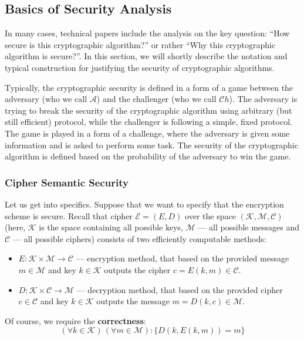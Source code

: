 \documentclass[../lecture-notes.tex]{subfiles}
\begin{document}
\subsection{Basics of Security Analysis}

In many cases, technical papers include the analysis on the key question: ``How secure is this cryptographic algorithm?'' or rather ``Why this cryptographic algorithm is secure?''. In this section, we will shortly describe the notation and typical construction for justifying the security of cryptographic algorithms.

Typically, the cryptographic security is defined in a form of a game between the adversary (who we call $\mathcal{A}$) and the challenger (who we call $\mathcal{C}h$). The adversary is trying to break the security of the cryptographic algorithm using arbitrary (but still efficient) protocol, while the challenger is following a simple, fixed protocol. The game is played in a form of a challenge, where the adversary is given some information and is asked to perform some task. The security of the cryptographic algorithm is defined based on the probability of the adversary to win the game.

\subsubsection{Cipher Semantic Security}
Let us get into specifics. Suppose that we want to specify that the encryption scheme is secure. Recall that cipher $\mathcal{E} = (E,D)$ over the space $(\mathcal{K}, \mathcal{M}, \mathcal{C})$ (here, $\mathcal{K}$ is the space containing all possible keys, $\mathcal{M}$ --- all possible messages and $\mathcal{C}$ --- all possible ciphers) consists of two efficiently computable methods:
\begin{itemize}
    \item $E: \mathcal{K} \times \mathcal{M} \to \mathcal{C}$ --- encryption method, that based on the provided message $m \in \mathcal{M}$ and key $k \in \mathcal{K}$ outputs the cipher $c = E(k,m) \in \mathcal{C}$.
    \item $D: \mathcal{K} \times \mathcal{C} \to \mathcal{M}$ --- decryption method, that based on the provided cipher $c \in \mathcal{C}$ and key $k \in \mathcal{K}$ outputs the message $m = D(k,c) \in \mathcal{M}$.
\end{itemize}

Of course, we require the \textbf{correctness}:
\begin{equation}
    (\forall k \in \mathcal{K}) \, (\forall m \in \mathcal{M}): \{D(k,E(k,m)) = m\}
\end{equation}
\end{document}

